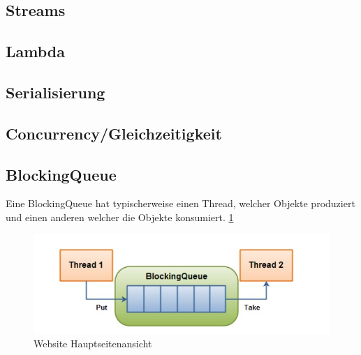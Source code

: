 \subsection{Streams}

\subsection{Lambda}

\subsection{Serialisierung}

\subsection{Concurrency/Gleichzeitigkeit}



\subsection{BlockingQueue}

Eine BlockingQueue hat typischerweise einen Thread, welcher Objekte produziert und einen anderen welcher die Objekte konsumiert. \ref{fig:impl:BlockingQueue}

\begin{figure}
    \centering
    \includegraphics[scale=0.5]{pics/blockingQueue.jpg}
    \caption{Website Hauptseitenansicht}
    \label{fig:impl:BlockingQueue}
\end{figure}

